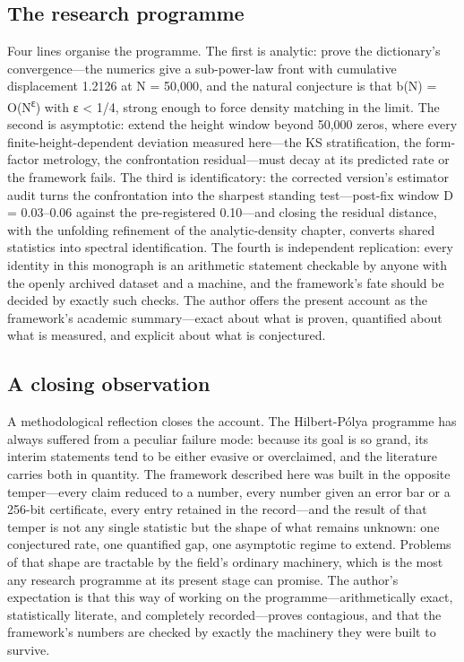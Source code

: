 \documentclass[10pt]{article}
\begin{document}
\subsection{The research programme}\label{sec:142}
Four lines organise the programme. The first is analytic: prove the dictionary's convergence---the numerics give a sub-power-law front with cumulative displacement 1.2126 at N = 50,000, and the natural conjecture is that b(N) = O(N\textsuperscript{ε}) with ε < 1/4, strong enough to force density matching in the limit. The second is asymptotic: extend the height window beyond 50,000 zeros, where every finite-height-dependent deviation measured here---the KS stratification, the form-factor metrology, the confrontation residual---must decay at its predicted rate or the framework fails. The third is identificatory: the corrected version's estimator audit turns the confrontation into the sharpest standing test---post-fix window D = 0.03--0.06 against the pre-registered 0.10---and closing the residual distance, with the unfolding refinement of the analytic-density chapter, converts shared statistics into spectral identification. The fourth is independent replication: every identity in this monograph is an arithmetic statement checkable by anyone with the openly archived dataset and a machine, and the framework's fate should be decided by exactly such checks. The author offers the present account as the framework's academic summary---exact about what is proven, quantified about what is measured, and explicit about what is conjectured.

\subsection{A closing observation}\label{sec:143}
A methodological reflection closes the account. The Hilbert-Pólya programme has always suffered from a peculiar failure mode: because its goal is so grand, its interim statements tend to be either evasive or overclaimed, and the literature carries both in quantity. The framework described here was built in the opposite temper---every claim reduced to a number, every number given an error bar or a 256-bit certificate, every entry retained in the record---and the result of that temper is not any single statistic but the shape of what remains unknown: one conjectured rate, one quantified gap, one asymptotic regime to extend. Problems of that shape are tractable by the field's ordinary machinery, which is the most any research programme at its present stage can promise. The author's expectation is that this way of working on the programme---arithmetically exact, statistically literate, and completely recorded---proves contagious, and that the framework's numbers are checked by exactly the machinery they were built to survive.
\end{document}
